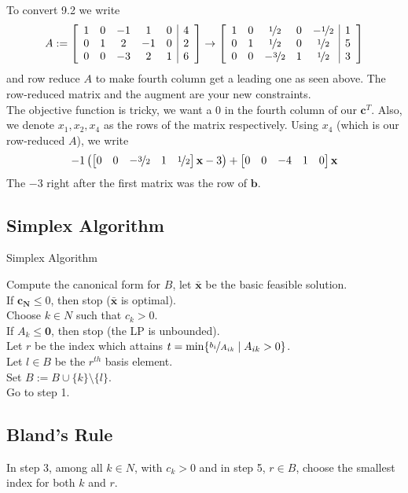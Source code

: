 To convert 9.2 we write
\[A:=
    \left[\begin{array}{ccccc|c}  
        1 & 0 & -1 & 1 & 0 & 4\\
        0 & 1 & 2 & -1 & 0 & 2\\
        0 & 0 & -3 & 2 & 1 & 6
       \end{array}\right]
    \rightarrow
    \left[\begin{array}{ccccc|c}
        1 & 0 & \nicefrac{1}{2} & 0 & -\nicefrac{1}{2} & 1\\
        0 & 1 & \nicefrac{1}{2} & 0 & \nicefrac{1}{2} & 5\\
        0 & 0 & -\nicefrac{3}{2} & 1 & \nicefrac{1}{2} & 3
    \end{array}\right]
\]
and row reduce $A$ to make fourth column get a leading one as seen above.
The row-reduced matrix and the augment are your new constraints.\\
The objective function is tricky, we want a 0 in the fourth column of our $\mathbf{c}^T$.
Also, we denote $x_1,x_2,x_4$ as the rows of the matrix respectively.
Using $x_4$ (which is our row-reduced $A$), we write
\[-1\left(
    \begin{bmatrix}
        0 & 0 & -\nicefrac{3}{2} & 1 & \nicefrac{1}{2}
    \end{bmatrix}\mathbf{x}-3\right)+
    \begin{bmatrix}
        0 & 0 & -4 & 1 & 0
    \end{bmatrix}\mathbf{x}
\]
The $-3$ right after the first matrix was the row of $\mathbf{b}$.

\subsection{Simplex Algorithm}
\begin{algorithm}
    \caption{Simplex Algorithm}
    Compute the canonical form for $B$, let $\mathbf{\bar{x}}$ be the basic feasible solution.\\
    If $\mathbf{c_N}\le 0$, then stop ($\mathbf{\bar{x}}$ is optimal).\\
    Choose $k\in N$ such that $c_k>0$.\\
    If $A_k\le \mathbf{0}$, then stop (the LP is unbounded).\\
    Let $r$ be the index which attains $t=\min\{\nicefrac{b_i}{A_{ik}}\mid A_{ik}>0\}$.\\
    Let $l\in B$ be the $r^{th}$ basis element.\\
    Set $B:=B\cup\{k\}\setminus\{l\}$.\\
    Go to step 1.
\end{algorithm}

\subsection{Bland's Rule}
In step 3, among all $k\in N$, with $c_k>0$ and in step 5, $r\in B$, 
choose the smallest index for both $k$ and $r$.

